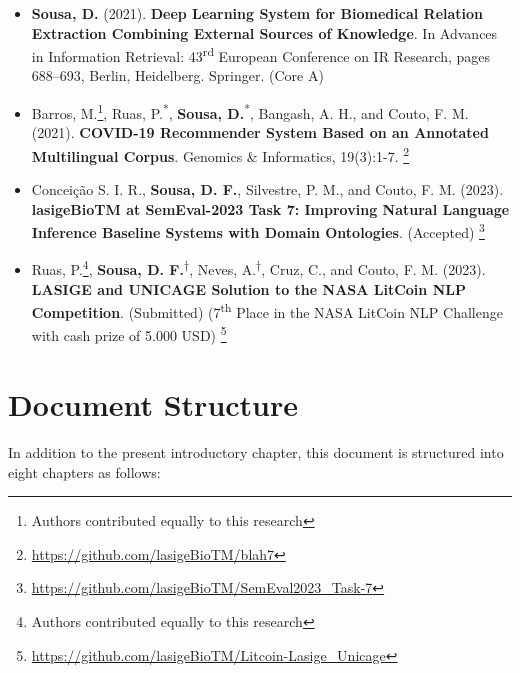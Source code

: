 \begin{itemize}
    \item{\textbf{Sousa, D.} (2021). \textbf{Deep Learning System for Biomedical Relation Extraction Combining External Sources of Knowledge}. In Advances in Information Retrieval: 43\textsuperscript{rd} European Conference on IR Research, pages 688–693, Berlin, Heidelberg. Springer. (Core A) \citep{sousa2021deep}}
\end{itemize}

\begin{itemize}
    \item{Barros, M.\footnote[*]{Authors contributed equally to this research}, Ruas, P.\textsuperscript{*}, \textbf{Sousa, D.}\textsuperscript{*}, Bangash, A. H., and Couto, F. M. (2021). \textbf{COVID-19 Recommender System Based on an Annotated Multilingual Corpus}. Genomics \& Informatics, 19(3):1-7. \citep{barros2021covid}} \footnote{\url{https://github.com/lasigeBioTM/blah7}}
\end{itemize} 

\begin{itemize}
    \item{Conceição S. I. R., \textbf{Sousa, D. F.}, Silvestre, P. M., and Couto, F. M. (2023). \textbf{lasigeBioTM at SemEval-2023 Task 7: Improving Natural Language Inference Baseline Systems with Domain Ontologies}. (Accepted)} \footnote{\url{https://github.com/lasigeBioTM/SemEval2023_Task-7}}
\end{itemize}

\begin{itemize}
    \item{Ruas, P.\footnote[†]{Authors contributed equally to this research}, \textbf{Sousa, D. F.}\textsuperscript{†}, Neves, A.\textsuperscript{†}, Cruz, C., and Couto, F. M. (2023). \textbf{LASIGE and UNICAGE Solution to the NASA LitCoin NLP Competition}. (Submitted) (7\textsuperscript{th} Place in the NASA LitCoin NLP Challenge with cash prize of 5.000 USD)} \footnote{\url{https://github.com/lasigeBioTM/Litcoin-Lasige_Unicage}}
\end{itemize}

\section{Document Structure}

In addition to the present introductory chapter, this document is structured into eight chapters as follows:

